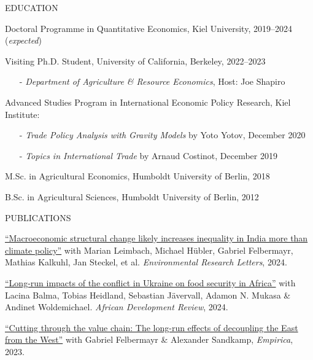 \documentclass{article}
\begin{document}

\begin{minipage}[t]{0.12\textwidth}
    {\selectfont EDUCATION} \\
\end{minipage}
\hspace{5mm}
\begin{minipage}[t]{0.8\textwidth}
    Doctoral Programme in Quantitative Economics, Kiel University, 2019--2024 (\textit{expected}) \par
    Visiting Ph.D. Student, University of California, Berkeley, 2022--2023 \par
        \begin{itemize}
        \item[-] \textit{Department of Agriculture \& Resource Economics}, Host: Joe Shapiro
    \end{itemize}
    Advanced Studies Program in International Economic Policy Research, Kiel Institute:
    \begin{itemize}
        \item[-] \textit{Trade Policy Analysis with Gravity Models} by Yoto Yotov, December 2020 
        \item[-] \textit{Topics in International Trade} by Arnaud Costinot, December 2019
    \end{itemize}
    M.Sc. in Agricultural Economics, Humboldt University of Berlin, 2018 \par
    B.Sc. in Agricultural Sciences, Humboldt University of Berlin, 2012 \par
\end{minipage}
\medskip


\begin{minipage}[t]{0.12\textwidth}
    {\selectfont PUBLICATIONS} \\
\end{minipage}
\hspace{5mm}
\begin{minipage}[t]{0.8\textwidth}
    \href{https://www.doi.org/10.1088/1748-9326/ad34e9}{``Macroeconomic structural change likely increases inequality in India more than climate policy''} with Marian Leimbach, Michael Hübler, Gabriel Felbermayr, Mathias Kalkuhl, Jan Steckel, et al. \textit{Environmental Research Letters}, 2024. \par
    \href{http://doi.org/10.1111/1467-8268.12745}{``Long-run impacts of the conflict in Ukraine on food security in Africa''} with Lacina Balma, Tobias Heidland, Sebastian Jävervall, Adamon N. Mukasa \& Andinet Woldemichael. \textit{African Development Review}, 2024. \par
    \href{https://doi.org/10.1007/s10663-022-09561-w}{``Cutting through the value chain: The long-run effects of decoupling the East from the West''} with Gabriel Felbermayr \& Alexander Sandkamp, \textit{Empirica}, 2023. \par
\end{minipage}
\medskip
\end{document}
